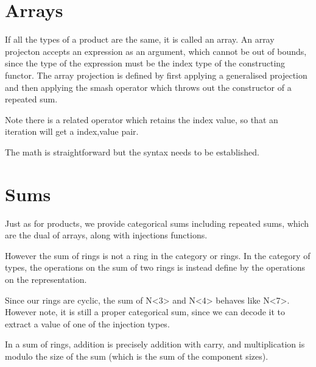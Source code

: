 \documentclass[oneside]{book}
\theoremstyle{plain}
\theoremstyle{definition}
\theoremstyle{plain}
\begin{document}
\section{Arrays}
If all the types of a product are the same, it is called an array.
An array projecton accepts an expression as an argument, which cannot
be out of bounds, since the type of the expression must be the index
type of the constructing functor. The array projection is defined by
first applying a generalised projection and then applying the smash 
operator which throws out the constructor of a repeated sum.

Note there is a related operator which retains the index value,
so that an iteration will get a index,value pair.

The math is straightforward but the syntax needs to be established.

\section{Sums}
Just as for products, we provide categorical sums including
repeated sums, which are the dual of arrays, along with 
injections functions.

However the sum of rings is not a ring in the category or rings.
In the category of types, the operations on the sum of two rings
is instead define by the operations on the representation.

Since our rings are cyclic, the sum of N<3> and N<4> behaves like
N<7>. However note, it is still a proper categorical sum, since we
can decode it to extract a value of one of the injection types.

In a sum of rings, addition is precisely addition with carry,
and multiplication is modulo the size of the sum (which is the
sum of the component sizes).
\end{document}
